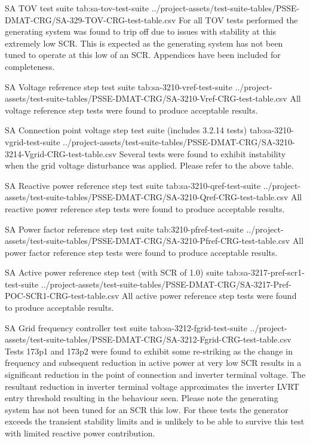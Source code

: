 \documentclass{../grid-link-report}
\newcommand{\projectassetsdir}{../project-assets}
\begin{document}
	{
		\fontsize{6}{8}\selectfont
		\autoscaledlongtable
		{SA TOV test suite}
		{tab:sa-tov-test-suite}
		{\projectassetsdir/test-suite-tables/PSSE-DMAT-CRG/SA-329-TOV-CRG-test-table.csv}
	}
	For all TOV tests performed the generating system was found to trip off due to issues with stability at this extremely low SCR. This is expected as the generating system has not been tuned to operate at this low of an SCR. Appendices have been included for completeness.
	
	{
		\fontsize{7}{9}\selectfont
		\autoscaledlongtable
		{SA Voltage reference step test suite}
		{tab:sa-3210-vref-test-suite}
		{\projectassetsdir/test-suite-tables/PSSE-DMAT-CRG/SA-3210-Vref-CRG-test-table.csv}
	}
	All voltage reference step tests were found to produce acceptable results.
	
	{
		\fontsize{7}{9}\selectfont
		\autoscaledlongtable
		{SA Connection point voltage step test suite (includes 3.2.14 tests)}
		{tab:sa-3210-vgrid-test-suite}
		{\projectassetsdir/test-suite-tables/PSSE-DMAT-CRG/SA-3210-3214-Vgrid-CRG-test-table.csv}
	}
	Several tests were found to exhibit instability when the grid voltage disturbance was applied. Please refer to the above table.
	
	{
		\fontsize{7}{9}\selectfont
		\autoscaledlongtable
		{SA Reactive power reference step test suite}
		{tab:sa-3210-qref-test-suite}
		{\projectassetsdir/test-suite-tables/PSSE-DMAT-CRG/SA-3210-Qref-CRG-test-table.csv}
	}
	All reactive power reference step tests were found to produce acceptable results.
	
	{
		\fontsize{7}{9}\selectfont
		\autoscaledlongtable
		{SA Power factor reference step test suite}
		{tab:3210-pfref-test-suite}
		{\projectassetsdir/test-suite-tables/PSSE-DMAT-CRG/SA-3210-Pfref-CRG-test-table.csv}
	}
	All power factor reference step tests were found to produce acceptable results.
	
	{
		\fontsize{7}{9}\selectfont
		\autoscaledlongtable
		{SA Active power reference step test (with SCR of 1.0) suite}
		{tab:sa-3217-pref-scr1-test-suite}
		{\projectassetsdir/test-suite-tables/PSSE-DMAT-CRG/SA-3217-Pref-POC-SCR1-CRG-test-table.csv}
	}
	All active power reference step tests were found to produce acceptable results.
	
	{
		\fontsize{7}{9}\selectfont
		\autoscaledlongtable
		{SA Grid frequency controller test suite}
		{tab:sa-3212-fgrid-test-suite}
		{\projectassetsdir/test-suite-tables/PSSE-DMAT-CRG/SA-3212-Fgrid-CRG-test-table.csv}
	}
	Tests 173p1 and 173p2 were found to exhibit some re-striking as the change in frequency and subsequent reduction in active power at very low SCR results in a significant reduction in the point of connection and inverter terminal voltage. The resultant reduction in inverter terminal voltage approximates the inverter LVRT entry threshold resulting in the behaviour seen. Please note the generating system has not been tuned for an SCR this low. For these tests the generator exceeds the transient stability limits and is unlikely to be able to survive this test with limited reactive power contribution.
	 
\end{document}
